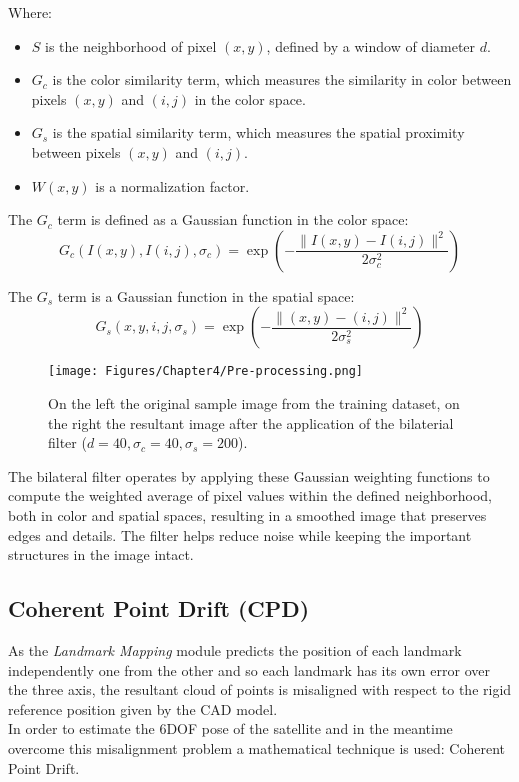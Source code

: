Where:
\begin{itemize}
    \item \(S\) is the neighborhood of pixel \((x, y)\), defined by a window of diameter \(d\).
    \item \(G_c\) is the color similarity term, which measures the similarity in color between pixels \((x, y)\) and \((i, j)\) in the color space.
    \item \(G_s\) is the spatial similarity term, which measures the spatial proximity between pixels \((x, y)\) and \((i, j)\).
    \item \(W(x, y)\) is a normalization factor.
\end{itemize}
The \(G_c\) term is defined as a Gaussian function in the color space:
\begin{equation}
    G_c(I(x, y), I(i, j), \sigma_c) = \exp\left(-\frac{\|I(x, y) - I(i, j)\|^2}{2\sigma_c^2}\right)
\end{equation}

The \(G_s\) term is a Gaussian function in the spatial space:
\begin{equation}
    G_s(x, y, i, j, \sigma_s) = \exp\left(-\frac{\|(x, y) - (i, j)\|^2}{2\sigma_s^2}\right)
\end{equation}

\begin{figure}[th]
    \centering
    \texttt{[image: Figures/Chapter4/Pre-processing.png]}
    \caption[Input and pre-processed image.]{On the left the original sample image from the training dataset, on the right the resultant image after the application of the bilaterial filter ($d = 40,\sigma_c = 40,\sigma_s = 200$).}
    \label{fig:Pre-processing}
\end{figure}

The bilateral filter operates by applying these Gaussian weighting functions to compute the weighted average of pixel values within the defined neighborhood, both in color and spatial spaces, resulting in a smoothed image that preserves edges and details. The filter helps reduce noise while keeping the important structures in the image intact.

\subsection{Coherent Point Drift (CPD)}
\label{Chapter4/CPD}
As the \textit{Landmark Mapping} module predicts the position of each landmark independently one from the other and so each landmark has its own error over the three axis, the resultant cloud of points is misaligned with respect to the rigid reference position given by the CAD model.\\
In order to estimate the 6DOF pose of the satellite and in the meantime overcome this misalignment problem a mathematical technique is used: Coherent Point Drift.

